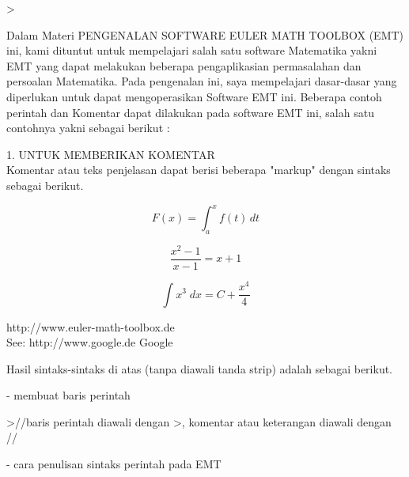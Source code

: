 \documentclass[a4paper,10pt]{article}
\begin{document}
\begin{eulernotebook}
\begin{eulercomment}
\end{eulercomment}
\eulersubheading{}
\begin{eulerprompt}
>  
\end{eulerprompt}
\begin{eulercomment}
Dalam Materi PENGENALAN SOFTWARE EULER MATH TOOLBOX (EMT) ini, kami dituntut untuk
mempelajari salah satu software Matematika yakni EMT yang dapat melakukan beberapa
pengaplikasian permasalahan dan persoalan Matematika. Pada pengenalan ini, saya mempelajari
dasar-dasar yang diperlukan untuk dapat mengoperasikan Software EMT ini. Beberapa contoh
perintah dan Komentar dapat dilakukan pada software EMT ini, salah satu contohnya yakni
sebagai berikut :

1. UNTUK MEMBERIKAN KOMENTAR\\
Komentar atau teks penjelasan dapat berisi beberapa "markup" dengan sintaks sebagai berikut.

\begin{eulercomment}
\begin{eulerformula}
\[
F (x) = \int_a^x f (t) \, dt
\]
\end{eulerformula}
\begin{eulerformula}
\[
\frac{x^2-1}{x-1} = x + 1
\]
\end{eulerformula}
\begin{eulerformula}
\[
\int {x^3}{\;dx}=C+\frac{x^4}{4}
\]
\end{eulerformula}
\begin{eulercomment}
http://www.euler-math-toolbox.de\\
See: http://www.google.de \textbar{} Google\\
\end{eulercomment}
\eulersubheading{}
\begin{eulercomment}
Hasil sintaks-sintaks di atas (tanpa diawali tanda strip) adalah sebagai berikut.

- membuat baris perintah
\end{eulercomment}
\begin{eulerprompt}
>//baris perintah diawali dengan >, komentar atau keterangan diawali dengan //
\end{eulerprompt}
\begin{eulercomment}
- cara penulisan sintaks perintah pada EMT


\end{eulercomment}
\end{eulercomment}
\end{eulercomment}
\end{eulernotebook}
\end{document}
